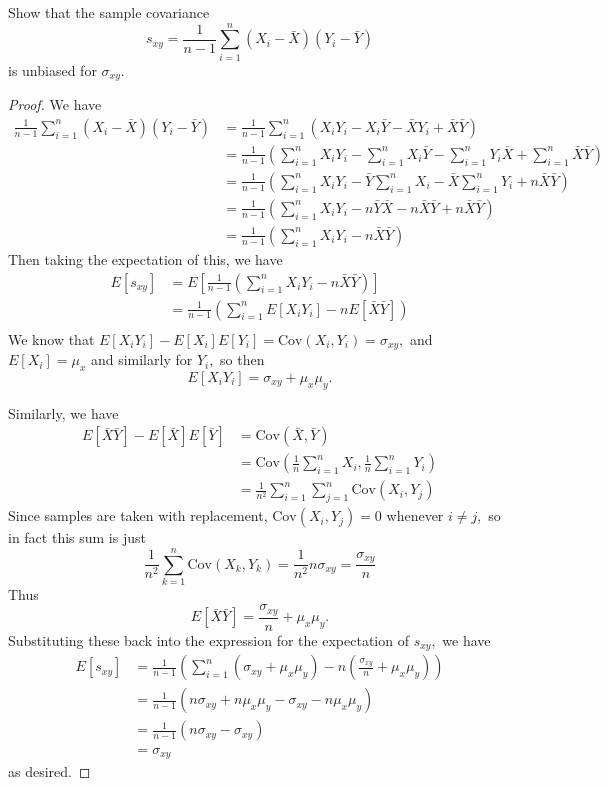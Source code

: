 \documentclass{article}
\newcommand{\cov}{\mathrm{Cov}}
\begin{document}
\begin{enumerate}
		Show that the sample covariance \[s_{xy}=\frac{1}{n-1}\sum_{i=1}^n (X_i-\bar{X})(Y_i-\bar{Y})\] is unbiased for $\sigma_{xy}.$
		\begin{proof}
			We have
			\begin{align*}
				\frac{1}{n-1}\sum_{i=1}^{n} (X_i-\bar{X})(Y_i-\bar{Y}) &= \frac{1}{n-1}\sum_{i=1}^{n} (X_iY_i-X_i\bar{Y}-\bar{X}Y_i+\bar{X}\bar{Y}) \\
				&= \frac{1}{n-1}\left(\sum_{i=1}^{n} X_iY_i - \sum_{i=1}^{n} X_i \bar{Y} - \sum_{i=1}^{n} Y_i\bar{X} + \sum_{i=1}^{n} \bar{X}\bar{Y} \right) \\
				&= \frac{1}{n-1}\left( \sum_{i=1}^{n} X_iY_i - \bar{Y}\sum_{i=1}^{n} X_i - \bar{X}\sum_{i=1}^{n} Y_i + n\bar{X}\bar{Y} \right) \\
				&= \frac{1}{n-1}\left( \sum_{i=1}^{n} X_iY_i - n\bar{Y}\bar{X}-n\bar{X}\bar{Y}+n\bar{X}\bar{Y} \right) \\
				&= \frac{1}{n-1}\left( \sum_{i=1}^{n} X_iY_i - n\bar{X}\bar{Y} \right)
			\end{align*} 
			Then taking the expectation of this, we have 
			\begin{align*}
				E[s_{xy}] &= E\left[ \frac{1}{n-1}\left( \sum_{i=1}^{n} X_iY_i - n\bar{X}\bar{Y} \right) \right] \\
				&= \frac{1}{n-1} \left(\sum_{i=1}^{n} E[X_iY_i]-nE[\bar{X}\bar{Y}]\right) \\
			\end{align*}
			We know that $E[X_iY_i]-E[X_i]E[Y_i]=\cov(X_i, Y_i)=\sigma_{xy},$ and $E[X_i]=\mu_x$ and similarly for $Y_i,$ so then \[E[X_iY_i]=\sigma_{xy}+\mu_x\mu_y.\] 

			Similarly, we have 
			\begin{align*}
				E[\bar{X}\bar{Y}]-E[\bar{X}]E[\bar{Y}]&=\cov(\bar{X}, \bar{Y}) \\
				&= \cov\left( \frac{1}{n}\sum_{i=1}^{n} X_i, \frac{1}{n}\sum_{i=1}^{n}Y_i \right) \\
				&= \frac{1}{n^2} \sum_{i=1}^{n}\sum_{j=1}^{n}\cov(X_i, Y_j)
			\end{align*}
			Since samples are taken with replacement, $\cov(X_i, Y_j)=0$ whenever $i\neq j,$ so in fact this sum is just \[\frac{1}{n^2}\sum_{k=1}^{n}\cov(X_k, Y_k) = \frac{1}{n^2}n\sigma_{xy} = \frac{\sigma_{xy}}{n}\] Thus \[E[\bar{X}\bar{Y}]=\frac{\sigma_{xy}}{n}+\mu_x\mu_y.\] Substituting these back into the expression for the expectation of $s_{xy},$ we have 
			\begin{align*}
				E[s_{xy}] &= \frac{1}{n-1}\left( \sum_{i=1}^{n} (\sigma_{xy}+\mu_x\mu_y) - n\left( \frac{\sigma_{xy}}{n}+\mu_x\mu_y \right) \right) \\
				&= \frac{1}{n-1} \left( n\sigma_{xy}+n\mu_x\mu_y-\sigma_{xy}-n\mu_x\mu_y \right) \\
				&= \frac{1}{n-1}(n\sigma_{xy}-\sigma_{xy}) \\
				&= \sigma_{xy}
			\end{align*} as desired.
		\end{proof}

\end{enumerate}
\end{document}
